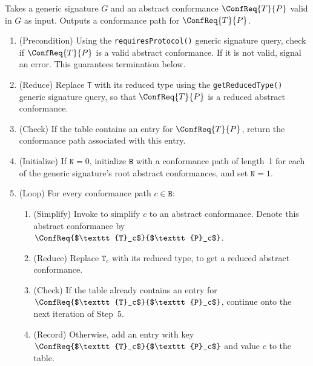 \documentclass[../generics]{subfiles}
\begin{document}
\begin{algorithm}\label{find conformance path algorithm}
Takes a generic signature $G$ and an abstract conformance $\ConfReq{T}{P}$ valid in $G$ as input. Outputs a conformance path for $\ConfReq{T}{P}$.

\begin{enumerate}
\item (Precondition) Using the \texttt{requiresProtocol()} generic signature query, check if $\ConfReq{T}{P}$ is a valid abstract conformance. If it is not valid, signal an error. This guarantees termination below.

\item (Reduce) Replace \texttt{T} with its reduced type using the \texttt{getReducedType()} generic signature query, so that $\ConfReq{T}{P}$ is a reduced abstract conformance.

\item (Check) If the table contains an entry for $\ConfReq{T}{P}$, return the conformance path associated with this entry.

\item (Initialize) If $\texttt{N}=0$, initialize \texttt{B} with a conformance path of length~1 for each of the generic signature's root abstract conformances, and set $\texttt{N}=1$.

\item (Loop) For every conformance path $c\in \texttt{B}$:

\begin{enumerate}

\item (Simplify) Invoke  to simplify $c$ to an abstract conformance. Denote this abstract conformance by $\ConfReq{$\texttt{T}_c$}{$\texttt{P}_c$}$.

\item (Reduce) Replace $\texttt{T}_c$ with its reduced type, to get a reduced abstract conformance.

\item (Check) If the table already contains an entry for $\ConfReq{$\texttt{T}_c$}{$\texttt{P}_c$}$, continue onto the next iteration of Step~5.

\item (Record) Otherwise, add an entry with key $\ConfReq{$\texttt{T}_c$}{$\texttt{P}_c$}$ and value $c$ to the table.


\end{enumerate}
\end{enumerate}
\end{algorithm}
\end{document}

